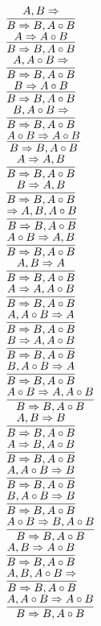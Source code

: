 \documentclass[11pt]{article}
\begin{document}
\begin{center}
\bigskip
\\$\infer{B\Rightarrow B, A\circ B}{A, B\Rightarrow }$
\bigskip
\\$\infer{B\Rightarrow B, A\circ B}{A\Rightarrow A\circ B}$
\bigskip
\\$\infer{B\Rightarrow B, A\circ B}{A, A\circ B\Rightarrow }$
\bigskip
\\$\infer{B\Rightarrow B, A\circ B}{B\Rightarrow A\circ B}$
\bigskip
\\$\infer{B\Rightarrow B, A\circ B}{B, A\circ B\Rightarrow }$
\bigskip
\\$\infer{B\Rightarrow B, A\circ B}{A\circ B\Rightarrow A\circ B}$
\bigskip
\\$\infer{B\Rightarrow B, A\circ B}{A\Rightarrow A, B}$
\bigskip
\\$\infer{B\Rightarrow B, A\circ B}{B\Rightarrow A, B}$
\bigskip
\\$\infer{B\Rightarrow B, A\circ B}{\Rightarrow A, B, A\circ B}$
\bigskip
\\$\infer{B\Rightarrow B, A\circ B}{A\circ B\Rightarrow A, B}$
\bigskip
\\$\infer{B\Rightarrow B, A\circ B}{A, B\Rightarrow A}$
\bigskip
\\$\infer{B\Rightarrow B, A\circ B}{A\Rightarrow A, A\circ B}$
\bigskip
\\$\infer{B\Rightarrow B, A\circ B}{A, A\circ B\Rightarrow A}$
\bigskip
\\$\infer{B\Rightarrow B, A\circ B}{B\Rightarrow A, A\circ B}$
\bigskip
\\$\infer{B\Rightarrow B, A\circ B}{B, A\circ B\Rightarrow A}$
\bigskip
\\$\infer{B\Rightarrow B, A\circ B}{A\circ B\Rightarrow A, A\circ B}$
\bigskip
\\$\infer{B\Rightarrow B, A\circ B}{A, B\Rightarrow B}$
\bigskip
\\$\infer{B\Rightarrow B, A\circ B}{A\Rightarrow B, A\circ B}$
\bigskip
\\$\infer{B\Rightarrow B, A\circ B}{A, A\circ B\Rightarrow B}$
\bigskip
\\$\infer{B\Rightarrow B, A\circ B}{B, A\circ B\Rightarrow B}$
\bigskip
\\$\infer{B\Rightarrow B, A\circ B}{A\circ B\Rightarrow B, A\circ B}$
\bigskip
\\$\infer{B\Rightarrow B, A\circ B}{A, B\Rightarrow A\circ B}$
\bigskip
\\$\infer{B\Rightarrow B, A\circ B}{A, B, A\circ B\Rightarrow }$
\bigskip
\\$\infer{B\Rightarrow B, A\circ B}{A, A\circ B\Rightarrow A\circ B}$

\end{center}
\end{document}
